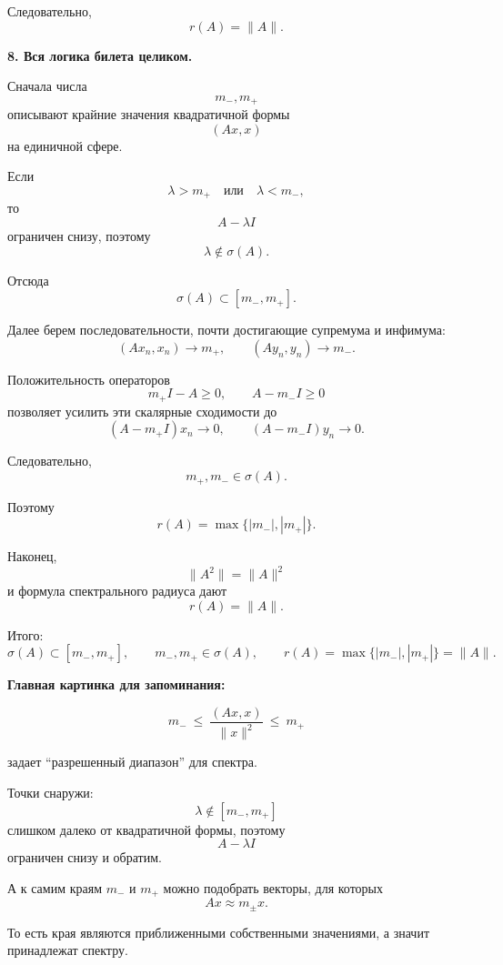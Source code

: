 \begin{idea}
	Следовательно,
	\[
	\boxed{r(A)=\|A\|.}
	\]
	
	\medskip
	
	\textbf{8. Вся логика билета целиком.}
	
	Сначала числа
	\[
	m_-,m_+
	\]
	описывают крайние значения квадратичной формы
	\[
	(Ax,x)
	\]
	на единичной сфере.
	
	Если
	\[
	\lambda>m_+
	\quad\text{или}\quad
	\lambda<m_-,
	\]
	то
	\[
	A-\lambda I
	\]
	ограничен снизу, поэтому
	\[
	\lambda\notin\sigma(A).
	\]
	
	Отсюда
	\[
	\sigma(A)\subset[m_-,m_+].
	\]
	
	Далее берем последовательности, почти достигающие супремума и инфимума:
	\[
	(Ax_n,x_n)\to m_+,
	\qquad
	(Ay_n,y_n)\to m_-.
	\]
	
	Положительность операторов
	\[
	m_+I-A\geq0,
	\qquad
	A-m_-I\geq0
	\]
	позволяет усилить эти скалярные сходимости до
	\[
	(A-m_+I)x_n\to0,
	\qquad
	(A-m_-I)y_n\to0.
	\]
	
	Следовательно,
	\[
	m_+,m_-\in\sigma(A).
	\]
	
	Поэтому
	\[
	r(A)=\max\{|m_-|,|m_+|\}.
	\]
	
	Наконец,
	\[
	\|A^2\|=\|A\|^2
	\]
	и формула спектрального радиуса дают
	\[
	r(A)=\|A\|.
	\]
	
	Итого:
	\[
	\boxed{
		\sigma(A)\subset[m_-,m_+],
		\qquad
		m_-,m_+\in\sigma(A),
		\qquad
		r(A)=\max\{|m_-|,|m_+|\}=\|A\|.
	}
	\]
	
	\medskip
	
	\textbf{Главная картинка для запоминания:}
	
	\[
	\boxed{
		m_-
		\ \leq\
		\frac{(Ax,x)}{\|x\|^2}
		\ \leq\
		m_+
	}
	\]
	
	задает ``разрешенный диапазон'' для спектра.
	
	Точки снаружи:
	\[
	\lambda\notin[m_-,m_+]
	\]
	слишком далеко от квадратичной формы, поэтому
	\[
	A-\lambda I
	\]
	ограничен снизу и обратим.
	
	А к самим краям \(m_-\) и \(m_+\) можно подобрать векторы,
	для которых
	\[
	Ax\approx m_\pm x.
	\]
	
	То есть края являются приближенными собственными значениями,
	а значит принадлежат спектру.
\end{idea}
